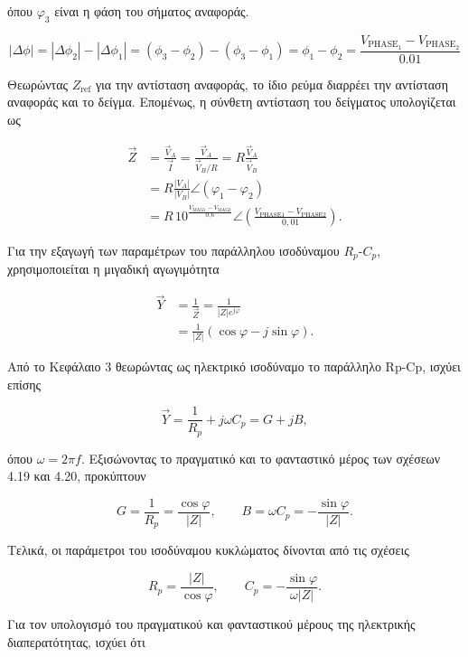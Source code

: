όπου \(\varphi_3\) είναι η φάση του σήματος αναφοράς.

\[
|\Delta \phi| = |\Delta \phi_2| - |\Delta \phi_1|
= (\phi_3 - \phi_2) - (\phi_3 - \phi_1)
= \phi_1 - \phi_2
= \frac{V_{\mathrm{PHASE}_1} - V_{\mathrm{PHASE}_2}}{0.01}
\tag{4.17}\]

Θεωρώντας \(Z_{\mathrm{ref}}\) για την αντίσταση αναφοράς, το ίδιο ρεύμα διαρρέει την αντίσταση αναφοράς και το δείγμα. Επομένως, η σύνθετη αντίσταση του δείγματος υπολογίζεται ως

\[
\begin{aligned}
\vec{Z}
&=\frac{\vec{V}_{A}}{\vec{I}}
 =\frac{\vec{V}_{A}}{\vec{V}_{B}/R}
 =R\frac{\vec{V}_{A}}{\vec{V}_{B}} \\
&=R\frac{\left|V_{A}\right|}{\left|V_{B}\right|}
  \angle\left(\varphi_{1}-\varphi_{2}\right) \\
&=R\,10^{\frac{V_{\mathrm{MAG}1}-V_{\mathrm{MAG}2}}{0{,}6}}
  \angle\left(\frac{V_{\mathrm{PHASE}1}-V_{\mathrm{PHASE}2}}{0{,}01}\right).
\end{aligned}
\tag{4.18}\]

Για την εξαγωγή των παραμέτρων του παράλληλου ισοδύναμου
\(R_{p}\)-\(C_{p}\), χρησιμοποιείται η μιγαδική αγωγιμότητα

\[
\begin{aligned}
\vec{Y}
&=\frac{1}{\vec{Z}}
 =\frac{1}{\left|Z\right|e^{j\varphi}} \\
&=\frac{1}{\left|Z\right|}
  \left(\cos\varphi-j\sin\varphi\right).
\end{aligned}
\tag{4.19}
\]

Από το Κεφάλαιο 3 θεωρώντας ως ηλεκτρικό ισοδύναμο το παράλληλο Rp-Cp, ισχύει επίσης

\[
\vec{Y}=\frac{1}{R_{p}}+j\omega C_{p}=G+jB,
\tag{4.20}
\]

όπου \(\omega=2\pi f\). Εξισώνοντας το πραγματικό και το φανταστικό μέρος
των σχέσεων 4.19 και 4.20, προκύπτουν

\[
G=\frac{1}{R_{p}}=\frac{\cos\varphi}{\left|Z\right|},
\qquad
B=\omega C_{p}=-\frac{\sin\varphi}{\left|Z\right|}.
\tag{4.21}
\]

Τελικά, οι παράμετροι του ισοδύναμου κυκλώματος δίνονται από τις σχέσεις


\[
R_{p}=\frac{\left|Z\right|}{\cos\varphi},
\qquad
C_{p}=-\frac{\sin\varphi}{\omega\left|Z\right|}.
\tag{4.22}
\]

Για τον υπολογισμό του πραγματικού και φανταστικού μέρους της ηλεκτρικής διαπερατότητας, ισχύει ότι 

